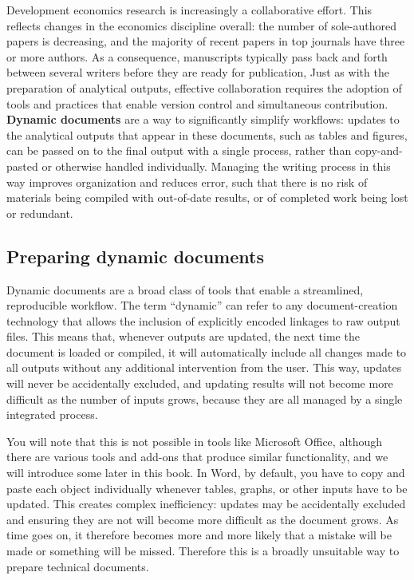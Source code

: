 Development economics research is increasingly a collaborative effort. 
This reflects changes in the economics discipline overall: 
the number of sole-authored papers is decreasing, 
and the majority of recent papers in top journals have three or more 
authors.
As a consequence, manuscripts typically pass back and forth between several writers
before they are ready for publication,
Just as with the preparation of analytical outputs,
effective collaboration requires the adoption of tools and practices 
that enable version control and simultaneous contribution.
\textbf{Dynamic documents} are a way to significantly simplify workflows:
updates to the analytical outputs that appear in these documents, such as tables and figures,
can be passed on to the final output with a single process,
rather than copy-and-pasted or otherwise handled individually.
Managing the writing process in this way
improves organization and reduces error,
such that there is no risk of materials being compiled
with out-of-date results, or of completed work being lost or redundant.

\subsection{Preparing dynamic documents}

Dynamic documents are a broad class of tools that enable a streamlined, reproducible workflow.
The term ``dynamic'' can refer to any document-creation technology
that allows the inclusion of explicitly encoded linkages to raw output files.
This means that, whenever outputs are updated,
the next time the document is loaded or compiled, it will automatically include
all changes made to all outputs without any additional intervention from the user.
This way, updates will never be accidentally excluded,
and updating results will not become more difficult
as the number of inputs grows,
because they are all managed by a single integrated process.

You will note that this is not possible in tools like Microsoft Office,
although there are various tools and add-ons that produce similar functionality,
and we will introduce some later in this book.
In Word, by default, you have to copy and paste each object individually
whenever tables, graphs, or other inputs have to be updated.
This creates complex inefficiency: updates may be accidentally excluded
and ensuring they are not will become more difficult as the document grows.
As time goes on, it therefore becomes more and more likely
that a mistake will be made or something will be missed.
Therefore this is a broadly unsuitable way to prepare technical documents.

